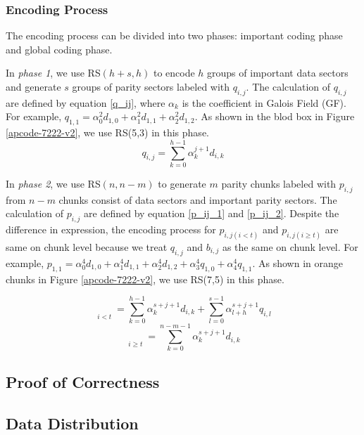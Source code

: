 \documentclass[conference]{IEEEtran}
\begin{document}
\subsubsection{Encoding Process}
The encoding process can be divided into two phases: important coding phase and global coding phase.

In \emph{phase 1}, we use RS$(h+s,h)$ to encode $h$ groups of important data sectors and generate $s$ groups of parity sectors labeled with $q_{i,j}$. The calculation of $q_{i,j}$ are defined by equation \ref{q_ij}, where $\alpha_k$ is the coefficient in Galois Field (GF).
For example, $q_{1,1} = \alpha_0^2 d_{1,0} + \alpha_1^2 d_{1,1} + \alpha_2^2 d_{1,2}$.
As shown in the blod box in Figure \ref{apcode-7222-v2}, we use RS(5,3) in this phase.
\begin{equation}\label{q_ij}
    q_{i,j} = \sum_{k=0}^{h-1} \alpha_k^{j+1} d_{i,k}
\end{equation}

In \emph{phase 2}, we use RS$(n,n-m)$ to generate $m$ parity chunks labeled with $p_{i,j}$ from $n-m$ chunks consist of data sectors and important parity sectors. The calculation of $p_{i,j}$ are defined by equation \ref{p_ij_1} and \ref{p_ij_2}.
Despite the difference in expression, the encoding process for $p_{i,j(i<t)}$ and $p_{i,j(i \geqslant t)}$ are same on chunk level because we treat $q_{i,j}$ and $b_{i,j}$ as the same on chunk level.
For example, $p_{1,1} = \alpha_0^4 d_{1,0} + \alpha_1^4 d_{1,1} + \alpha_2^4 d_{1,2} + \alpha_3^4 q_{1,0} + \alpha_4^4 q_{1,1}$.
As shown in orange chunks in Figure \ref{apcode-7222-v2}, we use RS(7,5) in this phase.

\begin{equation}\label{p_ij_1}
    \mathop{p_{i,j}}\limits_{i<t} =
    \sum_{k=0}^{h-1} \alpha_k^{s+j+1} d_{i,k} +
    \sum_{l=0}^{s-1} \alpha_{l+h}^{s+j+1} q_{i,l}
\end{equation}
\begin{equation}\label{p_ij_2}
    \mathop{p_{i,j}}\limits_{i \geqslant t} =
    \sum_{k=0}^{n-m-1} \alpha_k^{s+j+1} d_{i,k}
\end{equation}



\subsection{Proof of Correctness}
\subsection{Data Distribution}\label{Data Distribution}
\end{document}
